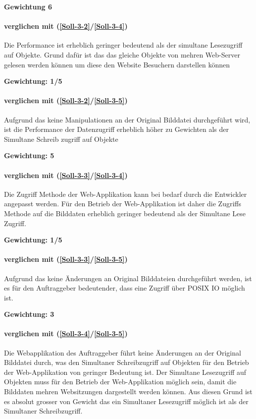 \textbf{Gewichtung 6}

\paragraph*{ verglichen mit  (\ref{Soll-3-2}/\ref{Soll-3-4})}
Die Performance ist erheblich geringer bedeutend als der simultane Lesezugriff auf Objekte. Grund dafür ist das das gleiche Objekte von mehren Web-Server gelesen werden können um diese den Website Besuchern darstellen können 

\textbf{Gewichtung: 1/5}

\paragraph*{ verglichen mit  (\ref{Soll-3-2}/\ref{Soll-3-5})}
Aufgrund das keine Manipulationen an der Original Bilddatei durchgeführt wird, ist die Performance der Datenzugriff erheblich höher zu Gewichten als der Simultane Schreib zugriff auf Objekte 

\textbf{Gewichtung: 5}


\paragraph*{ verglichen mit  (\ref{Soll-3-3}/\ref{Soll-3-4})}
Die Zugriff Methode der Web-Applikation kann bei bedarf durch die Entwickler angepasst werden. Für den Betrieb der Web-Applikation ist daher die Zugriffs Methode auf die Bilddaten erheblich geringer bedeutend als der Simultane Lese Zugriff.

\textbf{Gewichtung: 1/5}


\paragraph*{ verglichen mit  (\ref{Soll-3-3}/\ref{Soll-3-5})}
 Aufgrund das keine Änderungen an Original Bilddateien durchgeführt werden, ist es für den Auftraggeber bedeutender, dass eine Zugriff über POSIX IO möglich ist.

\textbf{Gewichtung: 3}


\paragraph*{ verglichen mit  (\ref{Soll-3-4}/\ref{Soll-3-5})}
Die Webapplikation des Auftraggeber führt keine Änderungen an der Original Bilddatei durch, was den Simultaner Schreibzugriff auf Objekten für den Betrieb der Web-Applikation von geringer Bedeutung ist. Der Simultane Lesezugriff auf Objekten muss für den Betrieb der Web-Applikation möglich sein, damit die Bilddaten mehren Websitzungen dargestellt werden können. Aus diesen Grund ist es absolut grosser von Gewicht das ein Simultaner Lesezugriff möglich ist als der Simultaner Schreibzugriff.

